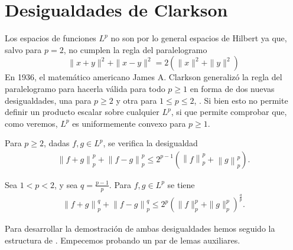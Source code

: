

\section{Desigualdades de Clarkson}

Los espacios de funciones $ L^p $ no son por lo general espacios de Hilbert ya que, salvo para $ p = 2 $, no cumplen la regla del paralelogramo
$$
    \| x + y \|^2 + \| x - y \|^2 = 2 \left( \| x \|^2 + \| y\|^2 \right)
$$
En 1936, el matemático americano James A. Clarkson generalizó la regla del paralelogramo para hacerla válida para todo $ p \geq 1 $ en forma de dos nuevas desigualdades, una para $p \geq 2 $ y otra para $ 1 \leq p \leq 2 $, \cite{clarkson}. Si bien esto no permite definir un producto escalar sobre cualquier $ L^p $, si que permite comprobar que, como veremos, $ L^p $ es uniformemente convexo para $ p \geq 1 $.

\begin{theorem} \label{thm:clarkson-1}
    Para $ p \geq 2 $, dadas $ f, g \in L^p $, se verifica la desigualdad
    \begin{align} \label{eq:clarkson-1}
        \left\| f+g \right\|_p^p + \left\| f-g \right\|_p^p \leq 2^{p-1} \left( \left\|f\right\|_p^p + \left\|g\right\|_p^p \right).
    \end{align}
\end{theorem}

\begin{theorem}
    Sea $ 1 < p < 2 $, y sea $ q = \frac{p-1}{p}$. Para $ f, g \in L^p $ se tiene
    \begin{align} \label{eq:clarkson-2}
        \left\| f + g \right\|_p^q + \left\| f - g \right\|_p^q \leq 2^p \left(\|f \|_p^p + \|g\|_p^p \right)^{\frac{q}{p}}.
    \end{align}
\end{theorem}

Para desarrollar la demostración de ambas desigualdades hemos seguido la estructura de \cite{hewitt}. Empecemos probando un par de lemas auxiliares.

